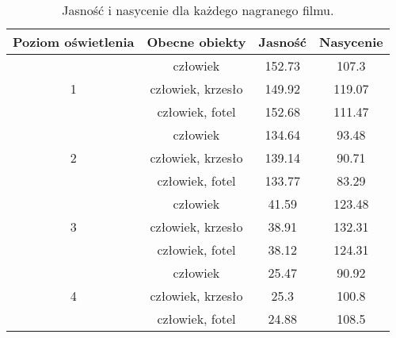 \begin{table}[H]
    \centering
    \caption{Jasność i nasycenie dla każdego nagranego filmu.}
    \begin{tabular}{|c|c|c|c|}
    \hline
    Poziom oświetlenia          & Obecne obiekty    & Jasność & Nasycenie \\ \hline
    \multirow{3}{*}{1} & człowiek          & 152.73  & 107.3     \\ \cline{2-4} 
                       & człowiek, krzesło & 149.92  & 119.07    \\ \cline{2-4} 
                       & człowiek, fotel   & 152.68  & 111.47    \\ \hline
    \multirow{3}{*}{2} & człowiek          & 134.64  & 93.48     \\ \cline{2-4} 
                       & człowiek, krzesło & 139.14  & 90.71     \\ \cline{2-4} 
                       & człowiek, fotel   & 133.77  & 83.29     \\ \hline
    \multirow{3}{*}{3} & człowiek          & 41.59   & 123.48    \\ \cline{2-4} 
                       & człowiek, krzesło & 38.91   & 132.31    \\ \cline{2-4} 
                       & człowiek, fotel   & 38.12   & 124.31    \\ \hline
    \multirow{3}{*}{4} & człowiek          & 25.47   & 90.92     \\ \cline{2-4} 
                       & człowiek, krzesło & 25.3    & 100.8     \\ \cline{2-4} 
                       & człowiek, fotel   & 24.88   & 108.5     \\ \hline
    \end{tabular}
    \label{tab:saturation-value-table}
    \end{table}